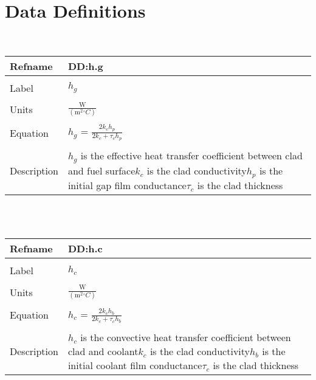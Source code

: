 \documentclass[12pt]{article}
\begin{document}
\section{Data Definitions}
\label{Sec:DD}
~\newline
\noindent \begin{minipage}{\textwidth}
\begin{tabular}{p{} p{}}
\toprule \textbf{Refname} & \textbf{DD:h.g}
\label{DD:h.g}
\\ \midrule \\
Label & $h_{g}$
\\ \midrule \\
Units & $\frac{\text{W}}{(\text{m}^{2}{}^{\circ}C)}$
\\ \midrule \\
Equation & $h_{g}$ = $\frac{2k_{c}h_{p}}{2k_{c}+\tau{}_{c}h_{p}}$
\\ \midrule \\
Description & $h_{g}$ is the effective heat transfer coefficient between clad and fuel surface\newline$k_{c}$ is the clad conductivity\newline$h_{p}$ is the initial gap film conductance\newline$\tau{}_{c}$ is the clad thickness
\\ \bottomrule \end{tabular}
\end{minipage}\\
~\newline
\noindent \begin{minipage}{\textwidth}
\begin{tabular}{p{} p{}}
\toprule \textbf{Refname} & \textbf{DD:h.c}
\label{DD:h.c}
\\ \midrule \\
Label & $h_{c}$
\\ \midrule \\
Units & $\frac{\text{W}}{(\text{m}^{2}{}^{\circ}C)}$
\\ \midrule \\
Equation & $h_{c}$ = $\frac{2k_{c}h_{b}}{2k_{c}+\tau{}_{c}h_{b}}$
\\ \midrule \\
Description & $h_{c}$ is the convective heat transfer coefficient between clad and coolant\newline$k_{c}$ is the clad conductivity\newline$h_{b}$ is the initial coolant film conductance\newline$\tau{}_{c}$ is the clad thickness
\\ \bottomrule \end{tabular}
\end{minipage}\\
\end{document}
